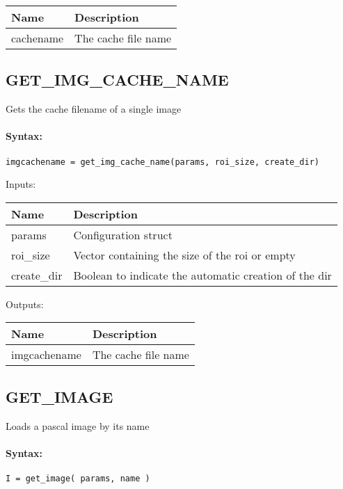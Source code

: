 \begin{tabular}{|p{}|p{}|}
\hline
\textbf{Name} & \textbf{Description} \\
\hline \hline
cachename & The cache file name  \\ \hline
\end{tabular}

\subsection{GET\_IMG\_CACHE\_NAME}

Gets the cache filename of a single image

\paragraph{Syntax:} \verb|imgcachename = get_img_cache_name(params, roi_size, create_dir)|

\bigskip
Inputs:

\begin{tabular}{|p{}|p{}|}
\hline
\textbf{Name} & \textbf{Description} \\
\hline \hline
params & Configuration struct  \\ \hline
roi\_size & Vector containing the size of the roi or empty  \\ \hline
create\_dir & Boolean to indicate the automatic creation of the dir  \\ \hline
\end{tabular}

\bigskip
Outputs:

\begin{tabular}{|p{}|p{}|}
\hline
\textbf{Name} & \textbf{Description} \\
\hline \hline
imgcachename & The cache file name  \\ \hline
\end{tabular}

\subsection{GET\_IMAGE}

Loads a pascal image by its name

\paragraph{Syntax:} \verb|I = get_image( params, name )|

